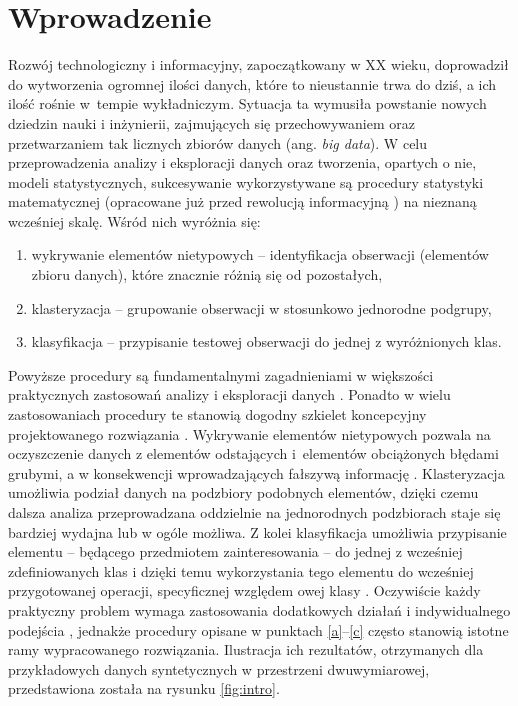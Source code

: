 \chapter{Wprowadzenie}

Rozwój technologiczny i informacyjny, zapoczątkowany w XX wieku, doprowadził do wytworzenia ogromnej ilości danych, które to nieustannie trwa do dziś, a ich ilość rośnie w~tempie wykładniczym. Sytuacja ta wymusiła powstanie nowych dziedzin nauki i inżynierii, zajmujących się przechowywaniem oraz przetwarzaniem tak licznych zbiorów danych (ang. \textit{big data}). W celu przeprowadzenia analizy i eksploracji danych oraz tworzenia, opartych o nie,  modeli statystycznych, sukcesywanie wykorzystywane są procedury statystyki matematycznej (opracowane już przed rewolucją informacyjną \cite{Robertson_1990}) na nieznaną wcześniej skalę. Wśród nich wyróżnia się:
\begin{enumerate}[label=(\alph*)] %
\item \label{a} wykrywanie elementów nietypowych \cite{Aggarwal_2017, Barnett_1978} -- identyfikacja obserwacji (elementów zbioru danych), które znacznie różnią się od pozostałych,
\item klasteryzacja \cite{Xu_2008} -- grupowanie obserwacji w stosunkowo jednorodne podgrupy,
\item \label{c} klasyfikacja \cite{Duda_2000} -- przypisanie testowej obserwacji do jednej z wyróżnionych klas.
\end{enumerate}
Powyższe procedury są fundamentalnymi zagadnieniami w większości praktycznych zastosowań analizy i eksploracji danych \cite{Nisbet_2018}. Ponadto w wielu zastosowaniach procedury te stanowią dogodny szkielet koncepcyjny projektowanego rozwiązania \cite{Aggarwal_2015}. Wykrywanie elementów nietypowych pozwala na oczyszczenie danych z elementów odstających i~elementów obciążonych błędami grubymi, a w konsekwencji wprowadzających fałszywą informację \cite{Zieba_2013}. Klasteryzacja umożliwia podział danych na podzbiory podobnych elementów, dzięki czemu dalsza analiza przeprowadzana oddzielnie na jednorodnych podzbiorach staje się bardziej wydajna lub w ogóle możliwa. Z kolei klasyfikacja umożliwia przypisanie elementu -- będącego przedmiotem zainteresowania -- do jednej z wcześniej zdefiniowanych klas i dzięki temu wykorzystania tego elementu do wcześniej przygotowanej operacji, specyficznej względem owej klasy \cite{Kulczycki_2007}. Oczywiście każdy praktyczny problem wymaga zastosowania dodatkowych działań i indywidualnego podejścia \cite{Larose_2014}, jednakże procedury opisane w punktach \ref{a}--\ref{c} często stanowią istotne ramy wypracowanego rozwiązania. Ilustracja ich rezultatów, otrzymanych dla przykładowych danych syntetycznych w przestrzeni dwuwymiarowej, przedstawiona została na rysunku \ref{fig:intro}.

